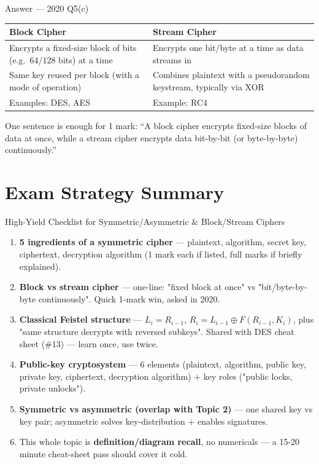 \documentclass[12pt,a4paper]{article}
\begin{document}
\begin{solbox}{Answer --- 2020 Q5(c)}
\begin{center}
\begin{tabular}{p{4.5cm}p{4.5cm}}
\toprule
\textbf{Block Cipher} & \textbf{Stream Cipher} \\
\midrule
Encrypts a fixed-size block of bits (e.g.\ 64/128 bits) at a time & Encrypts one bit/byte at a time as data streams in \\
Same key reused per block (with a mode of operation) & Combines plaintext with a pseudorandom keystream, typically via XOR \\
Examples: DES, AES & Example: RC4 \\
\bottomrule
\end{tabular}
\end{center}
One sentence is enough for 1 mark: ``A block cipher encrypts fixed-size blocks of data at once, while a stream cipher encrypts data bit-by-bit (or byte-by-byte) continuously.''
\end{solbox}

\newpage
\section*{Exam Strategy Summary}

\begin{keybox}{High-Yield Checklist for Symmetric/Asymmetric \& Block/Stream Ciphers}
\begin{enumerate}[noitemsep]
  \item \textbf{5 ingredients of a symmetric cipher} --- plaintext, algorithm, secret key, ciphertext, decryption algorithm (1 mark each if listed, full marks if briefly explained).
  \item \textbf{Block vs stream cipher} --- one-line: "fixed block at once" vs "bit/byte-by-byte continuously". Quick 1-mark win, asked in 2020.
  \item \textbf{Classical Feistel structure} --- $L_i=R_{i-1}$, $R_i=L_{i-1}\oplus F(R_{i-1},K_i)$, plus "same structure decrypts with reversed subkeys". Shared with DES cheat sheet (\#13) --- learn once, use twice.
  \item \textbf{Public-key cryptosystem} --- 6 elements (plaintext, algorithm, public key, private key, ciphertext, decryption algorithm) + key roles ("public locks, private unlocks").
  \item \textbf{Symmetric vs asymmetric (overlap with Topic 2)} --- one shared key vs key pair; asymmetric solves key-distribution + enables signatures.
  \item This whole topic is \textbf{definition/diagram recall}, no numericals --- a 15-20 minute cheat-sheet pass should cover it cold.
\end{enumerate}
\end{keybox}
\end{document}
